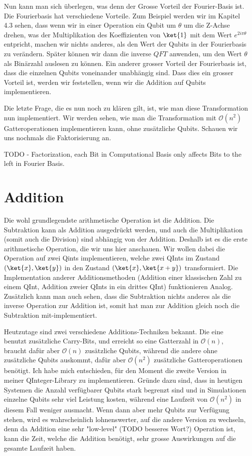 Nun kann man sich überlegen, was denn der Grosse Vorteil der Fourier-Basis ist. Die Fourierbasis hat verschiedene Vorteile. Zum Beispiel werden wir im Kapitel 4.3 sehen, dass wenn wir in einer Operation ein Qubit um $\theta$ um die Z-Achse drehen, was der Multiplikation des Koeffizienten von $\ket{1}$ mit dem Wert $e^{2i\pi\theta}$ entpricht, machen wir nichts anderes, als den Wert der Qubits in der Fourierbasis zu verändern. Später können wir dann die inverse $QFT$ anwenden, um den Wert $\theta$ als Binärzahl auslesen zu können. Ein anderer grosser Vorteil der Fourierbasis ist, dass die einzelnen Qubits voneinander unabhängig sind. Dass dies ein grosser Vorteil ist, werden wir feststellen, wenn wir die Addition auf Qubits implementieren.

Die letzte Frage, die es nun noch zu klären gilt, ist, wie man diese Transformation nun implementiert. Wir werden sehen, wie man die Transformation mit $\mathcal O(n^2)$ Gatteroperationen implementieren kann, ohne zusätzliche Qubits. Schauen wir uns nochmals die Faktorisierung an.

TODO - Factorization, each Bit in Computational Basis only affects Bits to the left in Fourier Basis.

\section{Addition}
Die wohl grundlegendste arithmetische Operation ist die Addition. Die Subtraktion kann als Addition ausgedrückt werden, und auch die Multiplikation (somit auch die Division) sind abhängig von der Addition. Deshalb ist es die erste arithmetische Operation, die wir uns hier anschauen. Wir wollen dabei die Operation auf zwei Qints implementieren, welche zwei QInts im Zustand $(\ket{x}, \ket{y})$ in den Zustand $(\ket{x}, \ket{x + y})$ transformiert. Die Implementation anderer Additionsmethoden (Addition einer klassischen Zahl zu einem QInt, Addition zweier QInts in ein drittes QInt) funktionieren Analog. Zusätzlich kann man auch sehen, dass die Subtraktion nichts anderes als die inverse Operation zur Addition ist, somit hat man zur Addition gleich noch die Subtraktion mit-implementiert.

Heutzutage sind zwei verschiedene Additions-Techniken bekannt. Die eine benutzt zusätzliche Carry-Bits, und erreicht so eine Gatterzahl in $\mathcal O(n)$, braucht dafür aber $\mathcal O(n)$ zusätzliche Qubits, während die andere ohne zusätzliche Qubits auskommt, dafür aber $\mathcal O(n^2)$ zusätzliche Gatteroperationen benötigt. Ich habe mich entschieden, für den Moment die zweite Version in meiner QInteger-Library zu implementieren. Gründe dazu sind, dass in heutigen Systemen die Anzahl verfügbarer Qubits stark begrenzt sind und in Simulationen einzelne Qubits sehr viel Leistung kosten, während eine Laufzeit von $\mathcal O(n^2)$ in diesem Fall weniger ausmacht. Wenn dann aber mehr Qubits zur Verfügung stehen, wird es wahrscheinlich lohnenswerter, auf die andere Version zu wechseln, denn da Addition eine sehr "low-level" (TODO besseres Wort?) Operation ist, kann die Zeit, welche die Addition benötigt, sehr grosse Auswirkungen auf die gesamte Laufzeit haben.

